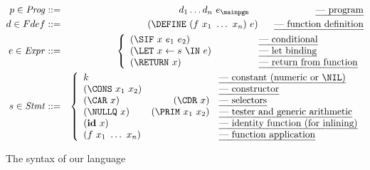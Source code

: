 \documentclass{llncs}
\newcommand{\ID}{\mbox{$\mathbf{ id}$}} %
\begin{document}
\begin{figure}[t!]
\footnotesize
\begin{eqnarray*}
   p \in \mathit{Prog} & ::= & d_1 \ldots d_n \,\, e_\mainpgm
    \hspace{7em} \mbox{\em --- program}\\
    d \in Fdef & ::= & (\DEFINE\,\, (f\,\, x_1 \,\, \ldots \,\,x_n)\,\,
    e) 
    \hspace{1.7em} \mbox{\em --- function definition} \\
e \in \mathit{Expr} & ::= &
\left\{\begin{array}{ll@{\hspace{4em}}l}
       (\SIF\,\, x\,\, e_1\,\, e_2) && \mbox{\em --- conditional} \\ 
       (\LET\,\, x \leftarrow s\,\, \IN\,\, e) && \mbox{\em --- let binding} \\
       (\RETURN\,\, x) && \mbox{\em --- return from function}
    \end{array}\right. \\
s \in \mathit{Stmt} & ::= &
\left\{\begin{array}{lr@{\hspace{1em}}l}
       k && \mbox{\em --- constant (numeric or $\NIL$)}\\
       (\CONS\,\, x_1\,\, x_2) && \mbox{\em --- constructor} \\ 
       (\CAR\,\, x) &  (\CDR\,\, x) & \mbox{\em --- selectors} \\ 
       (\NULLQ\,\, x) & (\PRIM\,\, x_1\,\, x_2) & \mbox{\em ---  tester and generic arithmetic} \\ 
       (\ID\,\, x) && \mbox{\em ---  identity function (for inlining)} \\ 
       \multicolumn{2}{l}{(f\,\, x_1\,\,\ldots\,\, x_n)} 
            & \mbox{\em --- function application} 
    \end{array}\right.
\end{eqnarray*}
  \caption{The syntax of our language}\label{fig:lang-syntax}
\figrule
\normalsize
\end{figure}
\end{document}
